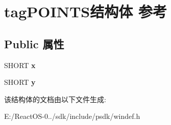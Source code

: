 \hypertarget{structtag_p_o_i_n_t_s}{}\section{tag\+P\+O\+I\+N\+T\+S结构体 参考}
\label{structtag_p_o_i_n_t_s}
\subsection*{Public 属性}
\begin{DoxyCompactItemize}
\item 
\mbox{\label{structtag_p_o_i_n_t_s_a73269f62ffd88b6bdf8bf5181631f868}} 
S\+H\+O\+RT {\bfseries x}
\item 
\mbox{\label{structtag_p_o_i_n_t_s_a481e65f69cf74278bea9e8c05d4b1896}} 
S\+H\+O\+RT {\bfseries y}
\end{DoxyCompactItemize}


该结构体的文档由以下文件生成\+:\begin{DoxyCompactItemize}
\item 
E\+:/\+React\+O\+S-\/0../sdk/include/psdk/windef.\+h\end{DoxyCompactItemize}
